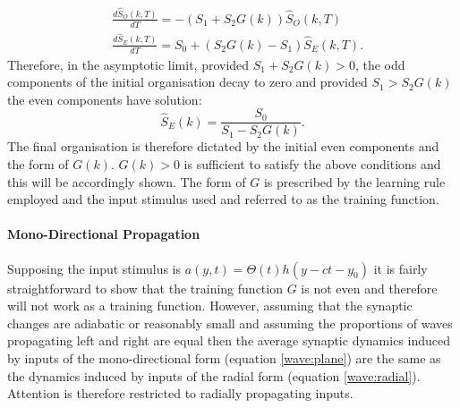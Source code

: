 \begin{align}
	&\frac{d\hat{S}_O(k,T)}{dT} =-(S_1 + S_2 G(k)) \hat{S}_O(k,T) \\
	&\frac{d\hat{S}_E(k,T)}{dT} = S_0 + (S_2 G(k) - S_1) \hat{S}_E(k,T) .
\end{align}
Therefore, in the asymptotic limit, provided $S_1 + S_2 G(k)>0$, the odd components of the initial organisation decay to zero and provided $S_1 > S_2 G(k)$ the even components have solution:
\begin{equation}
	\hat{S}_E(k) = \frac{S_0}{S_1 - S_2G(k)}. \label{eq:asymptoticsynapse}
\end{equation}
The final organisation is therefore dictated by the initial even components and the form of $G(k)$. $G(k) > 0$  is sufficient to satisfy the above conditions and this will be accordingly shown. The form of $G$ is prescribed by the learning rule employed and the input stimulus used and referred to as the training function.

\paragraph{Mono-Directional Propagation} \label{sec:monotoradial}
Supposing the input stimulus is $a(y,t) = \Theta(t) h(y-ct-y_0)$ it is fairly straightforward to show that the training function $G$ is not even and therefore will not work as a training function. However, assuming that the synaptic changes are adiabatic or reasonably small and assuming the proportions of waves propagating left and right are equal then the average synaptic dynamics induced by inputs of the mono-directional form (equation \ref{wave:plane}) are the same as the dynamics induced by inputs of the radial form (equation \ref{wave:radial}). Attention is therefore restricted to radially propagating inputs.
